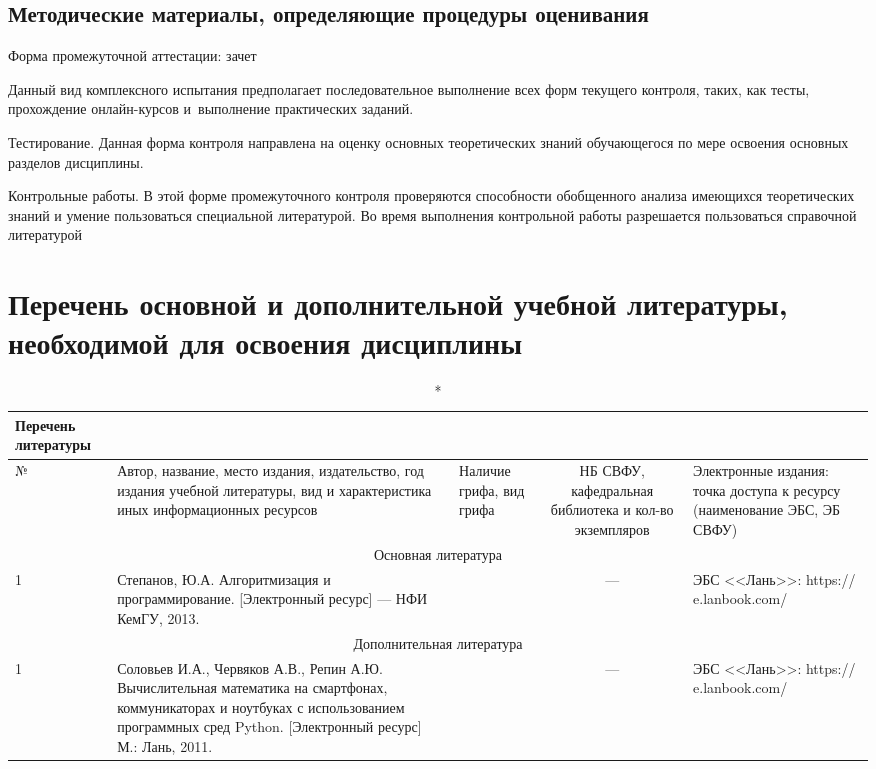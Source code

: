 \documentclass[a4paper,12pt]{article}
\begin{document}
\subsection{Методические материалы, определяющие процедуры оценивания}

Форма промежуточной аттестации: зачет
\par
Данный вид комплексного испытания предполагает последовательное выполнение
всех форм текущего контроля, таких, как тесты, прохождение онлайн-курсов
и~выполнение практических заданий.
\par
Тестирование. Данная форма контроля направлена на оценку основных
теоретических знаний обучающегося по мере освоения основных разделов дисциплины.
\par
Контрольные работы. В этой форме промежуточного контроля проверяются способности
обобщенного анализа имеющихся теоретических знаний и умение пользоваться
специальной литературой. Во время выполнения контрольной работы разрешается
пользоваться справочной литературой



\newpage
\section{Перечень основной и дополнительной учебной литературы, необходимой для освоения дисциплины}

  \begin{longtable}{|l|p{7cm}|p{18mm}|c|p{32mm}|}
  \caption*{Перечень литературы}\\
  \hline
  № & 
  \centering\small\arraybackslash Автор, название, место издания, издательство, год издания учебной литературы, вид и характеристика иных информационных ресурсов &
  \multicolumn{1}{p{18mm}|}{\centering\small\arraybackslash Наличие грифа, вид грифа} &
  \multicolumn{1}{p{21mm}|}{\centering\small\arraybackslash НБ СВФУ, кафедральная библиотека и кол-во экземпляров} & 
  \centering\small\arraybackslash Электронные издания: точка доступа к ресурсу (наименование ЭБС, ЭБ СВФУ)\\
  \hline
  \multicolumn{5}{|c|}{Основная литература}\\
  \hline
  1 &\raggedright\arraybackslash Степанов, Ю.А. Алгоритмизация и программирование. [Электронный ресурс] — НФИ КемГУ, 2013.  &    &  ---  & ЭБС <<Лань>>: https:// e.lanbook.com/ 
  \\
  \hline
  
  \multicolumn{5}{|c|}{Дополнительная литература}\\
  \hline
  1 &\raggedright\arraybackslash Соловьев И.А., Червяков А.В., Репин А.Ю. Вычислительная математика на смартфонах, коммуникаторах и ноутбуках с использованием программных сред Python. [Электронный ресурс]  М.: Лань, 2011.  &    &  ---  & ЭБС <<Лань>>: https:// e.lanbook.com/ 
  \\
  \hline
  
  \end{longtable}
  
\end{document}
